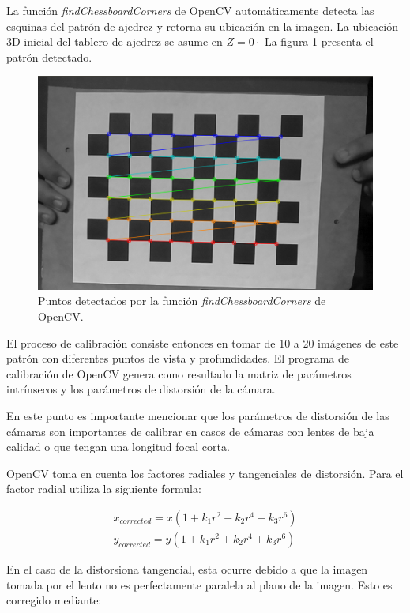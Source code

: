 La función \textit{findChessboardCorners} de OpenCV automáticamente detecta las esquinas del patrón de ajedrez y retorna su ubicación en la imagen. La ubicación 3D inicial del tablero de ajedrez se asume en $Z=0·$ La figura \ref{imagen:CalibracionAjedrez} presenta el patrón detectado.


\begin{figure}[H]
	\centering
	\includegraphics[width=0.7\linewidth]{imagenes/prototipo/Calibracion/cal1}
		
	\caption[Detección de esquinas]{Puntos detectados por la función \textit{findChessboardCorners} de OpenCV.}
	\label{imagen:CalibracionAjedrez}
\end{figure}


El proceso de calibración consiste entonces en tomar de 10 a 20 imágenes de este patrón con diferentes puntos de vista y profundidades. El programa de calibración de OpenCV genera como resultado la matriz de parámetros intrínsecos y los parámetros de distorsión de la cámara.

En este punto es importante mencionar que los parámetros de distorsión de las cámaras son importantes de calibrar en casos de cámaras con lentes de baja calidad o que tengan una longitud focal corta. 

OpenCV toma en cuenta los factores radiales y tangenciales de distorsión. Para el factor radial utiliza la siguiente formula:

\begin{align}
{ x }_{ corrected }=x(1+k_{ 1 }{ r }^{ 2 }+k_{ 2 }{ r }^{ 4 }+k_{ 3 }{ r }^{ 6 })\\ { y }_{ corrected }=y(1+k_{ 1 }{ r }^{ 2 }+k_{ 2 }{ r }^{ 4 }+k_{ 3 }{ r }^{ 6 })
\end{align}

En el caso de la distorsiona tangencial, esta ocurre debido a que la imagen tomada por el lento no es perfectamente paralela al plano de la imagen. Esto es corregido mediante:


